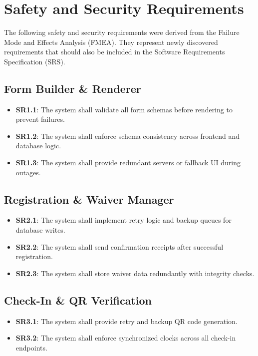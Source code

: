 \documentclass{article}
\begin{document}
\section{Safety and Security Requirements}

The following safety and security requirements were derived from the Failure Mode and Effects Analysis (FMEA). 
They represent newly discovered requirements that should also be included in the Software Requirements Specification (SRS).

\subsection{Form Builder \& Renderer}
\begin{itemize}
    \item \textbf{SR1.1}: The system shall validate all form schemas before rendering to prevent failures.
    \item \textbf{SR1.2}: The system shall enforce schema consistency across frontend and database logic.
    \item \textbf{SR1.3}: The system shall provide redundant servers or fallback UI during outages.
\end{itemize}

\subsection{Registration \& Waiver Manager}
\begin{itemize}
    \item \textbf{SR2.1}: The system shall implement retry logic and backup queues for database writes.
    \item \textbf{SR2.2}: The system shall send confirmation receipts after successful registration.
    \item \textbf{SR2.3}: The system shall store waiver data redundantly with integrity checks.
\end{itemize}

\subsection{Check-In \& QR Verification}
\begin{itemize}
    \item \textbf{SR3.1}: The system shall provide retry and backup QR code generation.
    \item \textbf{SR3.2}: The system shall enforce synchronized clocks across all check-in endpoints.
\end{itemize}
\end{document}

